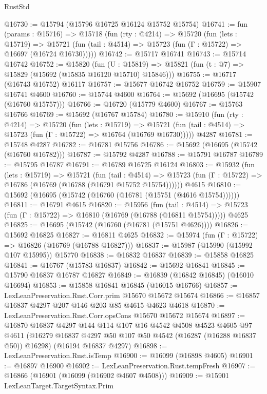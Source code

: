 \begin{lexlean}{RustStd}
\begin{coremodule}
@16730 := @15794 (@15796 @16725 @16124 @15752 @15754)
@16741 := fun (params : @15716) =>
  @15718
    (fun (rty : @4214) =>
    @15720
      (fun (lets : @15719) =>
      @15721 (fun (tail : @4514) => @15723 (fun (Γ : @15722) => @16697 (@16724 @16730)))))
@16742 := @15717 @16741
@16743 := @15714 @16742
@16752 := @15820
    (fun (U : @15819) => @15821 (fun (t : @7) => @15829 (@15692 (@15835 @16120 @15710) @15846)))
@16755 := @16717 (@16743 @16752) @16117
@16757 := @15677 @16742 @16752
@16759 := @15907 @16741 @4600
@16760 := @15744 @4600
@16764 := @15692 (@16695 (@15742 (@16760 @15757)))
@16766 := @16720 (@15779 @4600)
@16767 := @15763 @16766
@16769 := @15692 (@16767 @15784)
@16780 := @15910
    (fun (rty : @4214) =>
    @15720
      (fun (lets : @15719) =>
      @15721 (fun (tail : @4514) => @15723 (fun (Γ : @15722) => @16764 (@16769 @16730)))))
    @4287
@16781 := @15748 @4287
@16782 := @16781 @15756
@16786 := @15692 (@16695 (@15742 (@16760 @16782)))
@16787 := @15792 @4287
@16788 := @15791 @16787
@16789 := @15795 @16787
@16791 := @16789 @16725 @16124
@16803 := @15932
    (fun (lets : @15719) =>
    @15721
      (fun (tail : @4514) =>
      @15723 (fun (Γ : @15722) => @16786 (@16769 (@16788 (@16791 @15752 @15754))))))
    @4615
@16810 := @15692 (@16695 (@15742 (@16760 (@16781 (@15751 (@4616 @15754))))))
@16811 := @16791 @4615
@16820 := @15956
    (fun (tail : @4514) => @15723 (fun (Γ : @15722) => @16810 (@16769 (@16788 (@16811 @15754)))))
    @4625
@16825 := @16695 (@15742 (@16760 (@16781 (@15751 @4626))))
@16826 := @15692 @16825
@16827 := @16811 @4625
@16832 := @15974 (fun (Γ : @15722) => @16826 (@16769 (@16788 @16827)))
@16837 := @15987 (@15990 (@15992 @107 @15995)) @15770
@16838 := @16832 @16837
@16839 := @15858 @16825
@16841 := @16767 (@15783 @16837)
@16842 := @15692 @16841
@16845 := @15790 @16837 @16787 @16827
@16849 := @16839 (@16842 @16845) (@16010 @16694)
@16853 := @15858 @16841 @16845 (@16015 @16766)
@16857 := LexLeanPreservation.Rust.Corr.prim @15670 @15672 @15674
@16866 := @16857 @16837 @4297 @207 @146 @203 @85 @4615 @4623 @4618
@16870 := LexLeanPreservation.Rust.Corr.opsCons @15670 @15672 @15674
@16897 := @16870
    @16837
    @4297
    @144
    @114
    @107
    @16
    @4542
    @4508
    @4523
    @4605
    @97
    @4611
    (@16279 @16837 @4297 @50 @107 @50 @4542 (@16287 (@16288 @16837 @50)) @16298)
    (@16194 @16837 @4297)
@16898 := LexLeanPreservation.Rust.isTemp
@16900 := @16099 (@16898 @4605)
@16901 := @16897 @16900
@16902 := LexLeanPreservation.Rust.tempFresh
@16907 := @16866 (@16901 (@16099 (@16902 @4607 @4508)))
@16909 := @15901 LexLeanTarget.TargetSyntax.Prim

\end{coremodule}
\end{lexlean}
